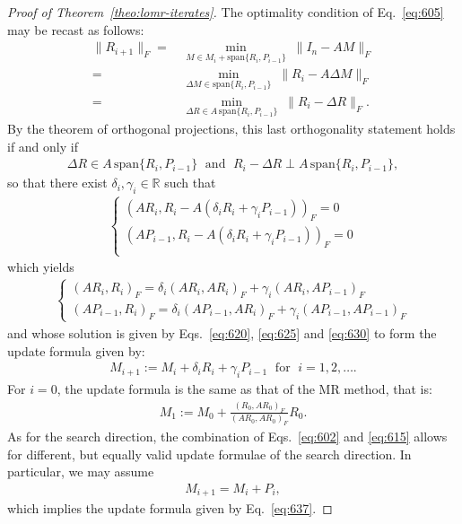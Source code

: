 \documentclass[numbers,webpdf,imanum]{ima-authoring-template}%
\theoremstyle{thmstyletwo}%
\numberwithin{equation}{section}
\begin{document}
\begin{proof}[Proof of Theorem~\ref{theo:lomr-iterates}]
The optimality condition of Eq.~\eqref{eq:605} may be recast as follows:
\begin{align*}
\|R_{i+1}\|_F=&\,
\underset{M\in M_i+\text{span}\{R_i,P_{i-1}\}}{\min}\;\|I_n-AM\|_F\\
=&\,
\underset{\Delta M\in\text{span}\{R_i,P_{i-1}\}}{\min}\;\|R_i-A\Delta M\|_F\\
=&\,\underset{\Delta R\in A\,\text{span}\{R_i,P_{i-1}\}}{\min}\;\|R_i-\Delta R\|_F.
\end{align*}
By the theorem of orthogonal projections, this last orthogonality statement holds if and only if
\begin{align}\label{eq:640}
\Delta R\in A\,\text{span}\{R_i,P_{i-1}\}
\;\text{ and }\;
R_i-\Delta R\perp A\,\text{span}\{R_i,P_{i-1}\},
\end{align}
so that there exist $\delta_i,\gamma_i\in\mathbb{R}$ such that
\begin{align}
\begin{cases}
(AR_i,R_i-A(\delta_iR_i+\gamma_i P_{i-1}))_F=0\\
(AP_{i-1},R_i-A(\delta_iR_i+\gamma_i P_{i-1}))_F=0\\
\end{cases}
\end{align}
which yields
\begin{align}
\begin{cases}
(AR_i,R_i)_F=\delta_i(AR_i,AR_i)_F+\gamma_i(AR_i,AP_{i-1})_F\\
(AP_{i-1},R_i)_F=\delta_i(AP_{i-1},AR_i)_F+\gamma_i(AP_{i-1},AP_{i-1})_F
\end{cases}
\end{align}
and whose solution is given by Eqs.~\eqref{eq:620}, \eqref{eq:625} and \eqref{eq:630} to form the 
update formula given by:
\begin{align*}
M_{i+1}:=M_i+\delta_iR_i+\gamma_iP_{i-1}
\;\text{ for }\;
i=1,2,\dots.
\end{align*}
For $i=0$, the update formula is the same as that of the MR method, that is:
\begin{align}
M_1:=M_0+\frac{(R_0,AR_0)_F}{(AR_0,AR_0)_F}R_0.
\end{align}
As for the search direction, the combination of Eqs.~\eqref{eq:602} and \eqref{eq:615} allows for different, but equally valid update formulae of the search direction.
In particular, we may assume
\begin{align}
M_{i+1}=M_i+P_i,
\end{align}
which implies the update formula given by Eq.~\eqref{eq:637}.
\end{proof}
\end{document}
